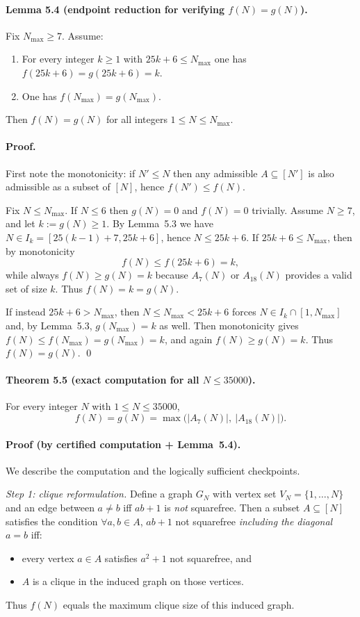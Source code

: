 \paragraph{Lemma 5.4 (endpoint reduction for verifying $f(N)=g(N)$).}
Fix $N_{\max}\ge 7$.
Assume:
\begin{enumerate}
\item For every integer $k\ge 1$ with $25k+6\le N_{\max}$ one has $f(25k+6)=g(25k+6)=k$.
\item One has $f(N_{\max})=g(N_{\max})$.
\end{enumerate}
Then $f(N)=g(N)$ for all integers $1\le N\le N_{\max}$.

\paragraph{Proof.}
First note the monotonicity: if $N'\le N$ then any admissible $A\subseteq[N']$ is also admissible as a subset of $[N]$, hence $f(N')\le f(N)$.

Fix $N\le N_{\max}$.
If $N\le 6$ then $g(N)=0$ and $f(N)=0$ trivially.
Assume $N\ge 7$, and let $k:=g(N)\ge 1$.
By Lemma~5.3 we have $N\in I_k=[25(k-1)+7,25k+6]$, hence $N\le 25k+6$.
If $25k+6\le N_{\max}$, then by monotonicity
\[
f(N)\le f(25k+6)=k,
\]
while always $f(N)\ge g(N)=k$ because $A_7(N)$ or $A_{18}(N)$ provides a valid set of size $k$.
Thus $f(N)=k=g(N)$.

If instead $25k+6> N_{\max}$, then $N\le N_{\max}<25k+6$ forces $N\in I_k\cap[1,N_{\max}]$ and, by Lemma~5.3, $g(N_{\max})=k$ as well.
Then monotonicity gives $f(N)\le f(N_{\max})=g(N_{\max})=k$, and again $f(N)\ge g(N)=k$.
Thus $f(N)=g(N)$.
\qed

\paragraph{Theorem 5.5 (exact computation for all $N\le 35000$).}
For every integer $N$ with $1\le N\le 35000$,
\[
f(N)=g(N)=\max\bigl(|A_7(N)|,\ |A_{18}(N)|\bigr).
\]

\paragraph{Proof (by certified computation + Lemma~5.4).}
We describe the computation and the logically sufficient checkpoints.

\emph{Step 1: clique reformulation.}
Define a graph $G_N$ with vertex set $V_N=\{1,\dots,N\}$ and an edge between $a\ne b$ iff $ab+1$ is \emph{not} squarefree.
Then a subset $A\subseteq[N]$ satisfies the condition $\forall a,b\in A$, $ab+1$ not squarefree \emph{including the diagonal $a=b$} iff:
\begin{itemize}
\item every vertex $a\in A$ satisfies $a^2+1$ not squarefree, and
\item $A$ is a clique in the induced graph on those vertices.
\end{itemize}
Thus $f(N)$ equals the maximum clique size of this induced graph.

